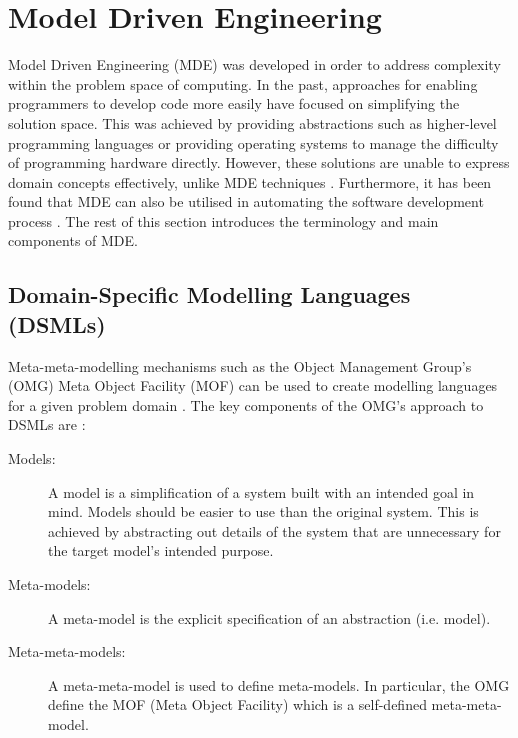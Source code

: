 \documentclass{UoYCSproject}
\begin{document}





\section{Model Driven Engineering}
Model Driven Engineering (MDE) was developed in order to address complexity within the problem space of computing. In the past, approaches for enabling programmers to develop code more easily have focused on simplifying the solution space. This was achieved by providing abstractions such as higher-level programming languages or providing operating systems to manage the difficulty of programming hardware directly. However, these solutions are unable to express domain concepts effectively, unlike MDE techniques \parencite{schmidt2006model}. Furthermore, it has been found that MDE can also be utilised in automating the software development process \parencite{bezivin2004search}.
\newline
The rest of this section introduces the terminology and main components of MDE.

\subsection{Domain-Specific Modelling Languages (DSMLs)}
Meta-meta-modelling mechanisms such as the Object Management Group's (OMG) Meta Object Facility (MOF) can be used to create modelling languages for a given problem domain \parencite{mussbacher2014relevance}. The key components of the OMG's approach to DSMLs are \parencite{bezivin2001towards}:
\begin{description}
\item[Models:] A model is a simplification of a system built with an intended goal in mind. Models should be easier to use than the original system. This is achieved by abstracting out details of the system that are unnecessary for the target model's intended purpose.
\item[Meta-models:] A meta-model is the explicit specification of an abstraction (i.e. model). 
\item[Meta-meta-models:]  A meta-meta-model is used to define meta-models. In particular, the OMG define the MOF (Meta Object Facility) which is a self-defined meta-meta-model.
\end{description}
\end{document}
